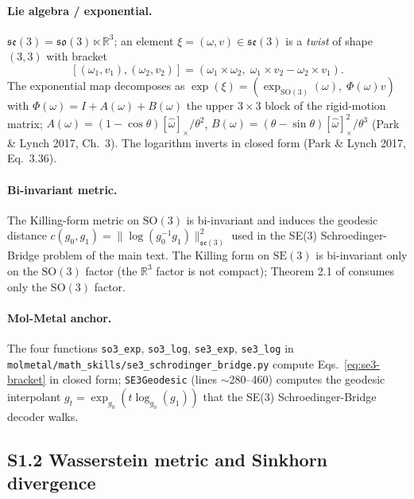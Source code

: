 \paragraph{Lie algebra / exponential.}
$\mathfrak{se}(3) = \mathfrak{so}(3) \ltimes \mathbb{R}^{3}$; an
element $\xi = (\omega, v) \in \mathfrak{se}(3)$ is a \emph{twist}
of shape $(3, 3)$ with bracket
\begin{equation}
  \label{eq:se3-bracket}
  [(\omega_1, v_1), (\omega_2, v_2)]
    = (\omega_1 \times \omega_2,\; \omega_1 \times v_2 - \omega_2 \times v_1).
\end{equation}
The exponential map decomposes as
$\exp(\xi) = (\exp_{\mathrm{SO}(3)}(\omega),\; \Phi(\omega) v)$
with $\Phi(\omega) = I + A(\omega) + B(\omega)$ the upper $3
\times 3$ block of the rigid-motion matrix; $A(\omega) =
(1 - \cos\theta) [\hat\omega]_\times / \theta^{2}$, $B(\omega) =
(\theta - \sin\theta) [\hat\omega]_\times^{2} / \theta^{3}$
(Park \& Lynch 2017, Ch.~3).  The logarithm inverts in closed
form (Park \& Lynch 2017, Eq.~3.36).

\paragraph{Bi-invariant metric.}
The Killing-form metric on $\mathrm{SO}(3)$ is bi-invariant and
induces the geodesic distance $c(g_0, g_1) = \| \log(g_0^{-1} g_1)
\|_{\mathfrak{se}(3)}^{2}$ used in the SE(3) Schroedinger-Bridge
problem of the main text.  The Killing form on $\mathrm{SE}(3)$
is bi-invariant only on the $\mathrm{SO}(3)$ factor (the
$\mathbb{R}^{3}$ factor is not compact); Theorem 2.1 of
\cite{mahmood2026sb_lie} consumes only the $\mathrm{SO}(3)$ factor.

\paragraph{Mol-Metal anchor.}
The four functions \texttt{so3\_exp}, \texttt{so3\_log},
\texttt{se3\_exp}, \texttt{se3\_log} in
\texttt{molmetal/math\_skills/se3\_schrodinger\_bridge.py}
compute Eqs.~\eqref{eq:se3-bracket} in closed form;
\texttt{SE3Geodesic} (lines $\sim$280--460) computes the geodesic
interpolant $g_t = \exp_{g_0}(t \log_{g_0}(g_1))$ that the
SE(3) Schroedinger-Bridge decoder walks.

\subsection*{S1.2 Wasserstein metric and Sinkhorn divergence}
\label{supp:s1-wasserstein}

